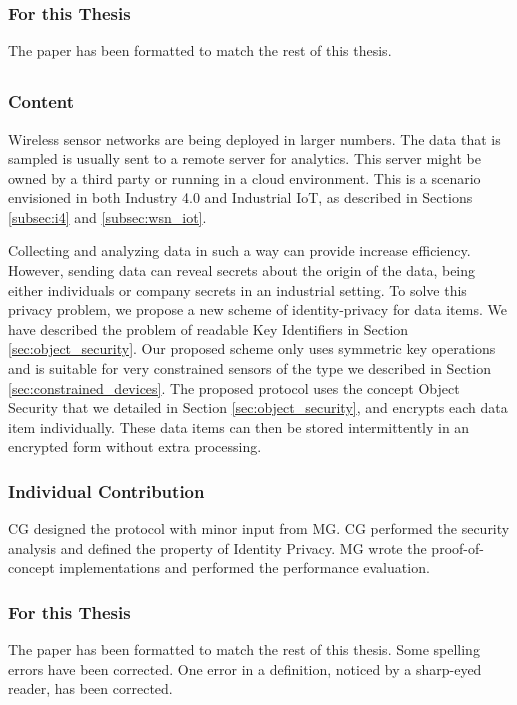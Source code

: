 \subsubsection{For this Thesis}
The paper has been formatted to match the rest of this thesis.


\subsection{\paperIItitle}
\subsubsection{Content}
Wireless sensor networks are being deployed in larger numbers. The data that is sampled is usually sent to a remote server for analytics. This server might be owned by a third party or running in a cloud environment. This is a scenario envisioned in both Industry 4.0 and Industrial IoT, as described in Sections \ref{subsec:i4} and \ref{subsec:wsn_iot}.

Collecting and analyzing data in such a way can provide increase efficiency. However, sending data can reveal secrets about the origin of the data, being either individuals or company secrets in an industrial setting. To solve this privacy problem, we propose a new scheme of identity-privacy for data items. We have described the problem of readable Key Identifiers in Section \ref{sec:object_security}. Our proposed scheme only uses symmetric key operations and is suitable for very constrained sensors of the type we described in Section \ref{sec:constrained_devices}. The proposed protocol uses the concept Object Security that we detailed in Section \ref{sec:object_security}, and encrypts each data item individually. These data items can then be stored intermittently in an encrypted form without extra processing.
\subsubsection{Individual Contribution}
CG designed the protocol with minor input from MG. CG performed the security analysis and defined the property of Identity Privacy. MG wrote the proof-of-concept implementations and performed the performance evaluation.
\subsubsection{For this Thesis}
The paper has been formatted to match the rest of this thesis. Some spelling errors have been corrected. One error in a definition, noticed by a sharp-eyed reader, has been corrected.


